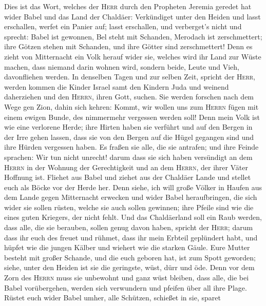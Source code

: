  Dies ist das Wort, welches der \textsc{Herr} durch den
Propheten Jeremia geredet hat wider Babel und das Land der Chaldäer:
 Verkündiget unter den Heiden und lasst erschallen, werfet
ein Panier auf; lasst erschallen, und verberget's nicht und sprecht:
Babel ist gewonnen, Bel steht mit Schanden, Merodach ist zerschmettert;
ihre Götzen stehen mit Schanden, und ihre Götter sind zerschmettert!
 Denn es zieht von Mitternacht ein Volk herauf wider sie,
welches wird ihr Land zur Wüste machen, dass niemand darin wohnen wird,
sondern beide, Leute und Vieh, davonfliehen werden.  In
denselben Tagen und zur selben Zeit, spricht der \textsc{Herr}, werden
kommen die Kinder Israel samt den Kindern Juda und weinend daherziehen
und den \textsc{Herrn}, ihren Gott, suchen.  Sie werden
forschen nach dem Wege gen Zion, dahin sich kehren: Kommt, wir wollen
uns zum \textsc{Herrn} fügen mit einem ewigen Bunde, des nimmermehr
vergessen werden soll!  Denn mein Volk ist wie eine
verlorene Herde; ihre Hirten haben sie verführt und auf den Bergen in
der Irre gehen lassen, dass sie von den Bergen auf die Hügel gegangen
sind und ihre Hürden vergessen haben.  Es fraßen sie alle,
die sie antrafen; und ihre Feinde sprachen: Wir tun nicht unrecht! darum
dass sie sich haben versündigt an dem \textsc{Herrn} in der Wohnung der
Gerechtigkeit und an dem \textsc{Herrn}, der ihrer Väter Hoffnung ist.
 Fliehet aus Babel und ziehet aus der Chaldäer Lande und
stellet euch als Böcke vor der Herde her.  Denn siehe, ich
will große Völker in Haufen aus dem Lande gegen Mitternacht erwecken und
wider Babel heraufbringen, die sich wider sie sollen rüsten, welche sie
auch sollen gewinnen; ihre Pfeile sind wie die eines guten Kriegers, der
nicht fehlt.  Und das Chaldäerland soll ein Raub werden,
dass alle, die sie berauben, sollen genug davon haben, spricht der
\textsc{Herr};  darum dass ihr euch des freuet und
rühmet, dass ihr mein Erbteil geplündert habt, und hüpfet wie die jungen
Kälber und wiehert wie die starken Gäule.  Eure Mutter
besteht mit großer Schande, und die euch geboren hat, ist zum Spott
geworden; siehe, unter den Heiden ist sie die geringste, wüst, dürr und
öde.  Denn vor dem Zorn des \textsc{Herrn} muss sie
unbewohnt und ganz wüst bleiben, dass alle, die bei Babel vorübergehen,
werden sich verwundern und pfeifen über all ihre Plage. 
Rüstet euch wider Babel umher, alle Schützen, schießet in sie, sparet
